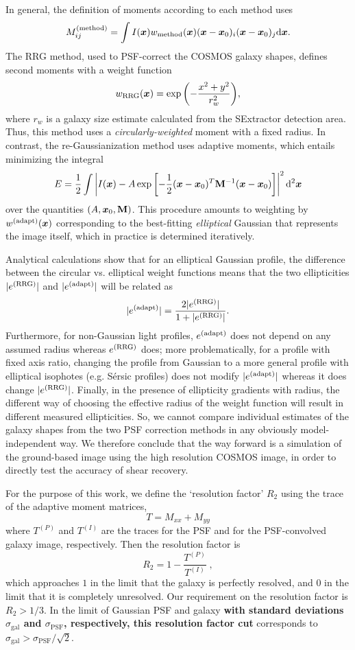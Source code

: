 \documentclass[twocolumn,useAMS,usenatbib]{mn2e}
\newcommand{\beq}{\begin{equation}}
\newcommand{\eeq}{\end{equation}}
\newcommand{\rmd}{\mathrm{d}}
\newcommand{\newtext}{}
\newcommand{\reftext}[1]{\textbf{#1}}
\begin{document}
 In general, the definition of moments
according to each method uses
\beq\label{E:xxmom}
M_{ij}^{\rm (method)} = \int I({\bmath x}) w_{\rm method}({\bmath x})
({\bmath x}-{\bmath x_0})_i ({\bmath x}-{\bmath x_0})_j \rmd{\bmath x}.
\eeq
The RRG method, used to PSF-correct the COSMOS galaxy shapes, defines
second moments with a weight
function 
\beq
w_{\rm RRG}({\bmath x}) = \exp{\left(-\frac{x^2 + y^2}{r_w^2}\right)},
\eeq
\newtext{where $r_w$ is a galaxy size estimate calculated from the
  SExtractor detection area.  Thus, this method uses a
{\em circularly-weighted} moment with a fixed radius.}  In contrast, the re-Gaussianization
method uses adaptive moments, which entails minimizing the integral
\beq
E = \frac{1}{2} \int \left| I({\bmath x}) - A\exp\left[
-\frac{1}{2} ({\bmath x}-{\bmath x}_0)^T {\bf M}^{-1}
({\bmath x}-{\bmath x}_0) \right] \right|^2 \rmd^2{\bmath x}
\eeq
over the quantities $(A,{\bmath x}_0,{\bf M})$.  This procedure amounts to
weighting by $w^\mathrm{(adapt)}({\bmath x})$ corresponding to the
best-fitting {\em elliptical} Gaussian that represents the image itself,
which in practice is determined iteratively.   

Analytical calculations show that for an elliptical Gaussian 
profile, the difference between the circular vs. elliptical weight
functions means that the two ellipticities $|e^{\rm (RRG)}|$ and $|e^{\rm
  (adapt)}|$ will be related as
\beq\label{E:relateellip}
|e^{\rm (adapt)}| = \frac{2 |e^{\rm (RRG)}|}{1+|e^{\rm (RRG)}|}.
\eeq
Furthermore, for non-Gaussian light profiles, $e^{\rm (adapt)}$ does
not depend on any assumed radius whereas $e^{\rm (RRG)}$ does; more
problematically, for a profile with fixed axis ratio, changing
the profile from Gaussian to a more general profile with elliptical
isophotes (e.g. S\'ersic profiles) does not modify 
$|e^{\rm (adapt)}|$ whereas it does change $|e^{\rm (RRG)}|$.
Finally, in the presence of ellipticity gradients with radius, the different way
of choosing the effective radius of the weight function will result in
different measured ellipticities.  So, we
cannot compare individual estimates of the galaxy shapes from the two
PSF correction methods in any obviously model-independent way.   We therefore conclude that
the way forward is a simulation of the ground-based image using the
high resolution COSMOS image, in order to directly test the accuracy
of shear
recovery. 

 For the purpose
of this work, we define the `resolution factor' $R_2$ using the
trace of the adaptive moment matrices, 
\beq
T = M_{xx} + M_{yy}
\eeq
where $T^{(P)}$ and $T^{(I)}$ are the traces for the PSF and for the
PSF-convolved galaxy image, respectively.  Then the resolution factor
is 
\beq
R_2 = 1 - \frac{T^{(P)}}{T^{(I)}}\;,
\eeq
which approaches $1$ in the limit that the galaxy is perfectly
resolved, and $0$ in the limit that it is completely unresolved.  Our
requirement on the resolution factor is $R_2 > 1/3$. In the
limit of Gaussian PSF and galaxy \reftext{with standard deviations
$\sigma_\mathrm{gal}$ and $\sigma_\mathrm{PSF}$, respectively, this
resolution factor cut} corresponds to $\sigma_\mathrm{gal} >
\sigma_\mathrm{PSF}/\sqrt{2}$. 
\end{document}
